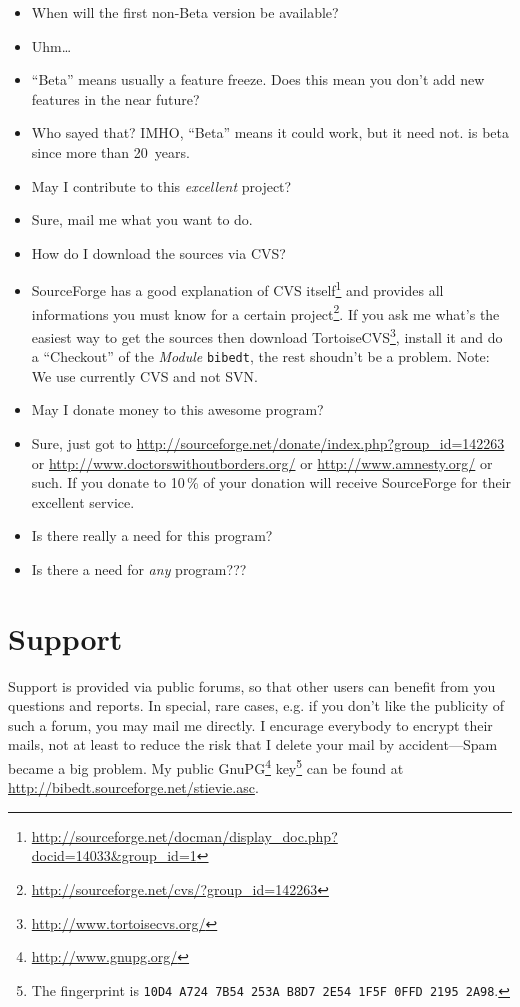 \documentclass[oneside,10pt]{article}
\newcommand{\question}[1]{\item[\textbf{Q:}] #1 \vspace{-1.5ex}}
\newcommand{\answer}[1]{\item[\textbf{A:}] #1}
\begin{document}
\begin{itemize}
  \question{When will the first non-Beta version be available?}
  \answer{Uhm\dots{}}
  
  \question{``Beta'' means usually a feature freeze. Does this mean you don't add
    new features in the near future?}
  \answer{Who sayed that? IMHO, ``Beta'' means it could work, but it need not.
    \BibTeX{} is beta since more than 20~years.}

  \question{May I contribute to this \emph{excellent} project?}
  \answer{Sure, mail me what you want to do.}
  
  \question{How do I download the sources via CVS?}
  \answer{SourceForge has a good explanation of CVS
    itself\footnote{\url{http://sourceforge.net/docman/display_doc.php?docid=14033&group_id=1}}
    and provides all informations you must know for a certain
    project\footnote{\url{http://sourceforge.net/cvs/?group_id=142263}}.
    If you ask me what's the easiest way to get the sources then download
    TortoiseCVS\footnote{\url{http://www.tortoisecvs.org/}}, install it and do a
    ``Checkout'' of the \emph{Module} \texttt{bibedt}, the rest shoudn't be a problem.
    Note: We use currently CVS and not SVN.}
  
  \question{May I donate money to this awesome program?}
  \answer{Sure, just got to \url{http://sourceforge.net/donate/index.php?group_id=142263}
    or \url{http://www.doctorswithoutborders.org/} or
    \url{http://www.amnesty.org/} or such. If you donate to \BibEdt{} 10\,\% of your
    donation will receive SourceForge for their excellent service.}

  \question{Is there really a need for this program?}
  \answer{Is there a need for \emph{any} program???}
\end{itemize}

\section{Support}
\label{sec:Support}

Support is provided via public forums, so that other users can benefit
from you questions and reports. In special, rare cases, e.g. if you don't like the
publicity of such a forum, you may mail me directly. I encurage everybody to encrypt
their mails, not at least to reduce the risk that I delete your mail by accident---Spam
became a big problem. My public GnuPG\footnote{\url{http://www.gnupg.org/}}
key\footnote{The fingerprint is \verb|10D4 A724 7B54 253A B8D7 2E54 1F5F 0FFD 2195 2A98|.}
can be found at \url{http://bibedt.sourceforge.net/stievie.asc}.
\end{document}
